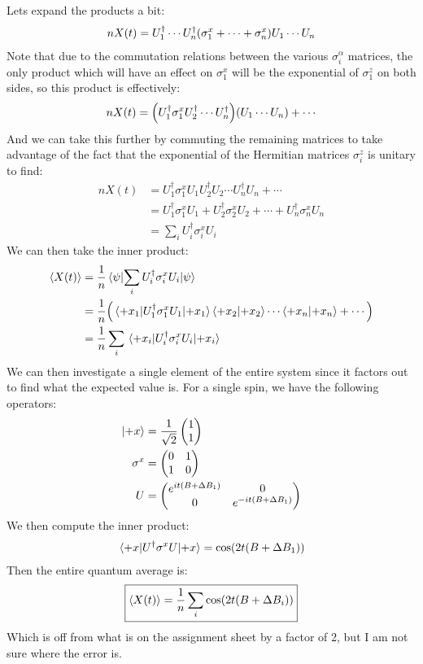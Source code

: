 \documentclass[12pt]{article}
\begin{document}
Lets expand the products a bit:
\begin{align*}
  nX(t)=U_1^\dag\cdots U_n^\dag\qty(\sigma_1^x+\cdots+\sigma_n^x)U_1\cdots U_n
\end{align*}
Note that due to the commutation relations between the various $\sigma_i^\alpha$ matrices, the only product which will have an effect on $\sigma_1^x$ will be the exponential of $\sigma_1^z$ on both sides, so this product is effectively:
\begin{align*}
  nX(t)=\qty(U_1^\dag\sigma_1^xU_2^\dag\cdots U_n^\dag)\qty(
  U_1\cdots U_n)+\cdots
\end{align*}
And we can take this further by commuting the remaining matrices to take advantage of the fact that the exponential of the Hermitian matrices $\sigma_i^z$ is unitary to find:
\begin{align*}
  nX(t)&=U_1^\dag\sigma_1^xU_1U_2^\dag U_2\cdots U_n^\dag U_n+\cdots\\
  &=U_1^\dag\sigma_1^xU_1+U_2^\dag\sigma_2^xU_2+\cdots+U_n^\dag\sigma_n^xU_n\\
  &=\sum_iU_i^\dag\sigma_i^xU_i
\end{align*}
We can then take the inner product:
\begin{align*}
  \ev{X(t)}&=\frac1n\mel{\psi}{\sum_iU_i^\dag\sigma_i^xU_i}{\psi}\\
  &=\frac1n
  \qty(\ev{U_1^\dag\sigma_1^xU_1}{+x_1}\ip{+x_2}\cdots\ip{+x_n}+\cdots)\\
  &=\frac1n\sum_i\ev{U_i^\dag\sigma_i^xU_i}{+x_i}
\end{align*}
We can then investigate a single element of the entire system since it factors out to find what the expected value is. For a single spin, we have the following operators:
\begin{align*}
  \ket{+x}&=\frac1{\sqrt{2}}\pmqty{1\\1}\\
  \sigma^x&=\pmqty{0&1\\1&0}\\
  U&=\pmqty{e^{it(B+\Delta{B}_1)}&0\\0&e^{-it(B+\Delta{B}_1)}}
\end{align*}
We then compute the inner product:
\begin{align*}
  \ev{U^\dag\sigma^xU}{+x}=\cos(2t(B+\Delta B_1))
\end{align*}
Then the entire quantum average is:
\begin{align}
  \boxed{\ev{X(t)}=\frac1n\sum_i\cos(2t(B+\Delta B_i))}
\end{align}
Which is off from what is on the assignment sheet by a factor of 2, but I am not sure where the error is.
\end{document}
